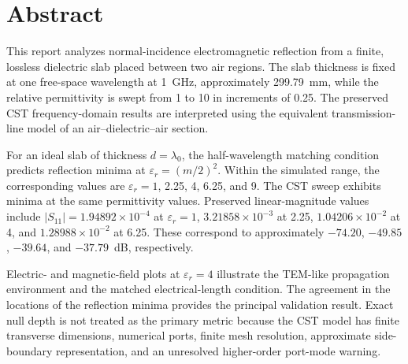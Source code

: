 \chapter*{Abstract}
\thispagestyle{fancy}
\begingroup
\setlength{\emergencystretch}{2em}

This report analyzes normal-incidence electromagnetic reflection from a finite,
lossless dielectric slab placed between two air regions. The slab thickness is fixed
at one free-space wavelength at 1~GHz, approximately 299.79~mm, while the relative
permittivity is swept from 1 to 10 in increments of 0.25. The preserved CST
frequency-domain results are interpreted using the equivalent transmission-line model
of an air--dielectric--air section.

For an ideal slab of thickness $d=\lambda_0$, the half-wavelength matching condition
predicts reflection minima at
$\varepsilon_r=(m/2)^2$. Within the simulated range, the corresponding values are
$\varepsilon_r=1$, 2.25, 4, 6.25, and 9. The CST sweep exhibits minima at the same
permittivity values. Preserved linear-magnitude values include
$|S_{11}|=1.94892\times10^{-4}$ at $\varepsilon_r=1$,
$3.21858\times10^{-3}$ at 2.25,
$1.04206\times10^{-2}$ at 4, and
$1.28988\times10^{-2}$ at 6.25. These correspond to approximately
$-74.20$, $-49.85$, $-39.64$, and $-37.79$~dB, respectively.

Electric- and magnetic-field plots at $\varepsilon_r=4$ illustrate the
TEM-like propagation environment and the matched electrical-length condition.
The agreement in the locations of the reflection minima provides the principal
validation result. Exact null depth is not treated as the primary metric because the
CST model has finite transverse dimensions, numerical ports, finite mesh resolution,
approximate side-boundary representation, and an unresolved higher-order port-mode
warning.

\par\endgroup
